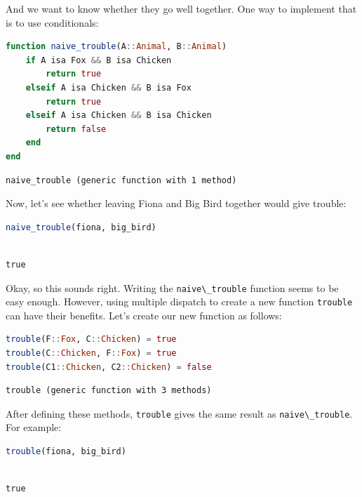 \documentclass[
  notoc %
]{tufte-book}
\newcommand{\passthrough}[1]{#1}
\begin{document}
And we want to know whether they go well together. One way to implement
that is to use conditionals:

\begin{lstlisting}[language=Julia]
function naive_trouble(A::Animal, B::Animal)
    if A isa Fox && B isa Chicken
        return true
    elseif A isa Chicken && B isa Fox
        return true
    elseif A isa Chicken && B isa Chicken
        return false
    end
end
\end{lstlisting}

\begin{lstlisting}[language=Output]
naive_trouble (generic function with 1 method)
\end{lstlisting}

Now, let's see whether leaving Fiona and Big Bird together would give
trouble:

\begin{lstlisting}[language=Julia]
naive_trouble(fiona, big_bird)
\end{lstlisting}

\begin{lstlisting}[language=Output]

true

\end{lstlisting}

Okay, so this sounds right. Writing the
\passthrough{\lstinline!naive\_trouble!} function seems to be easy
enough. However, using multiple dispatch to create a new function
\passthrough{\lstinline!trouble!} can have their benefits. Let's create
our new function as follows:

\begin{lstlisting}[language=Julia]
trouble(F::Fox, C::Chicken) = true
trouble(C::Chicken, F::Fox) = true
trouble(C1::Chicken, C2::Chicken) = false
\end{lstlisting}

\begin{lstlisting}[language=Output]
trouble (generic function with 3 methods)
\end{lstlisting}

After defining these methods, \passthrough{\lstinline!trouble!} gives
the same result as \passthrough{\lstinline!naive\_trouble!}. For
example:

\begin{lstlisting}[language=Julia]
trouble(fiona, big_bird)
\end{lstlisting}

\begin{lstlisting}[language=Output]

true

\end{lstlisting}
\end{document}
